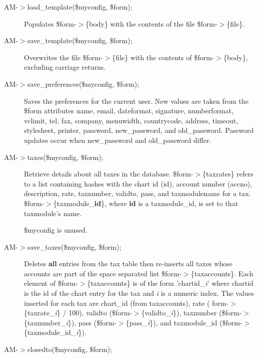 \begin{description}
\begin{description}
\begin{description}
\begin{description}
\begin{description}
\begin{description}
\begin{description}
\item[{AM-$>$load\_template(\$myconfig, \$form);}] \mbox{}

Populates \$form-$>$\{body\} with the contents of the file \$form-$>$\{file\}.


\item[{AM-$>$save\_template(\$myconfig, \$form);}] \mbox{}

Overwrites the file \$form-$>$\{file\} with the contents of \$form-$>$\{body\}, excluding
carriage returns.


\item[{AM-$>$save\_preferences(\$myconfig, \$form);}] \mbox{}

Saves the preferences for the current user.  New values are taken from the \$form
attributes name, email, dateformat, signature, numberformat, vclimit, tel, fax,
company, menuwidth, countrycode, address, timeout, stylesheet, printer,
password, new\_password, and old\_password.  Password updates occur when
new\_password and old\_password differ.


\item[{AM-$>$taxes(\$myconfig, \$form);}] \mbox{}

Retrieve details about all taxes in the database.  \$form-$>$\{taxrates\} refers to a
list containing hashes with the chart id (id), account number (accno),
description, rate, taxnumber, validto, pass, and taxmodulename for a tax.
\$form-$>$\{taxmodule\_\textbf{id}\}, where \textbf{id} is a taxmodule\_id, is set to that
taxmodule's name.



\$myconfig is unused.


\item[{AM-$>$save\_taxes(\$myconfig, \$form);}] \mbox{}

Deletes \textbf{all} entries from the tax table then re-inserts all taxes whose
accounts are part of the space separated list \$form-$>$\{taxaccounts\}.  Each
element of \$form-$>$\{taxaccounts\} is of the form 'chartid\_\textit{i}' where chartid is
the id of the chart entry for the tax and \textit{i} is a numeric index.  The values
inserted for each tax are chart\_id (from taxaccounts), rate (
form-$>$\{taxrate\_\textit{i}\} / 100), validto (\$form-$>$\{validto\_\textit{i}\}), taxnumber
(\$form-$>$\{taxnumber\_\textit{i}\}), pass (\$form-$>$\{pass\_\textit{i}\}), and taxmodule\_id
(\$form-$>$\{taxmodule\_id\_\textit{i}\}).


\item[{AM-$>$closedto(\$myconfig, \$form);}] \mbox{}


\end{description}
\end{description}
\end{description}
\end{description}
\end{description}
\end{description}
\end{description}
